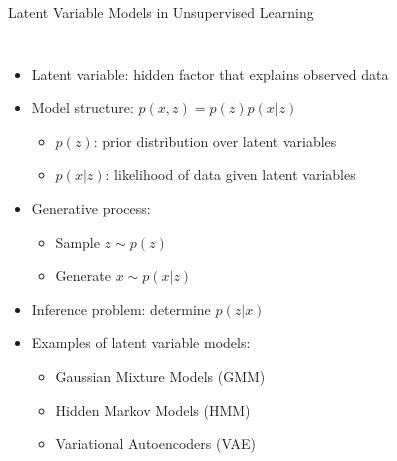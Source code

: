 \documentclass[5pt,aspectratio=169]{beamer}
\begin{document}
\begin{frame}{Latent Variable Models in Unsupervised Learning}
\begin{columns}
     \begin{itemize}
    \item Latent variable: hidden factor that explains observed data
    \item Model structure: $p(x,z) = p(z)p(x|z)$
      \begin{itemize}
        \item $p(z)$: prior distribution over latent variables
        \item $p(x|z)$: likelihood of data given latent variables
      \end{itemize}
    \item Generative process:
      \begin{itemize}
        \item Sample $z \sim p(z)$
        \item Generate $x \sim p(x|z)$
      \end{itemize}
    \item Inference problem: determine $p(z|x)$
    \item Examples of latent variable models:
      \begin{itemize}
        \item Gaussian Mixture Models (GMM)
        \item Hidden Markov Models (HMM)
        \item Variational Autoencoders (VAE)
      \end{itemize}
  \end{itemize}
  
    
\end{columns}
\end{frame}
 
\end{document}
